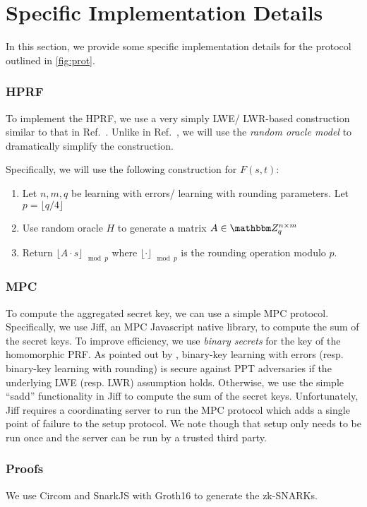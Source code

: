 \section{Specific Implementation Details}
In this section, we provide some specific implementation details for the protocol outlined in \cref{fig:prot}.

\subsubsection*{HPRF}
To implement the HPRF, we use a very simply LWE/ LWR-based construction similar to that in Ref.~\cite{boneh2013key}.
Unlike in Ref.~\cite{boneh2013key}, we will use the \emph{random oracle model} to dramatically simplify the construction.

Specifically, we will use the following construction for $F(s, t)$:
\begin{enumerate}
	\item Let $n, m, q$ be learning with errors/ learning with rounding parameters.
		Let $p = \lfloor q / 4 \rfloor$
	\item Use random oracle $H$ to generate a matrix $A \in \Z_q^{n \times m}$
	\item Return $\lfloor A \cdot s \rfloor_{\mod p}$ where $\lfloor \cdot \rfloor_{\mod p}$ is the rounding operation modulo $p$.
\end{enumerate}

\subsubsection*{MPC}
To compute the aggregated secret key, we can use a simple MPC protocol.
Specifically, we use Jiff, an MPC Javascript native library, to compute the sum of the secret keys.
To improve efficiency, we use \emph{binary secrets} for the key of the homomorphic PRF.
As pointed out by , binary-key learning with errors (resp. binary-key learning with rounding) is secure against PPT adversaries if the underlying LWE (resp. LWR) assumption holds.
Otherwise, we use the simple ``sadd'' functionality in Jiff to compute the sum of the secret keys.
Unfortunately, Jiff requires a coordinating server to run the MPC protocol which adds a single point of failure to the setup protocol.
We note though that setup only needs to be run once and the server can be run by a trusted third party.

\subsubsection*{Proofs}
We use Circom and SnarkJS with Groth16  to generate the zk-SNARKs.

